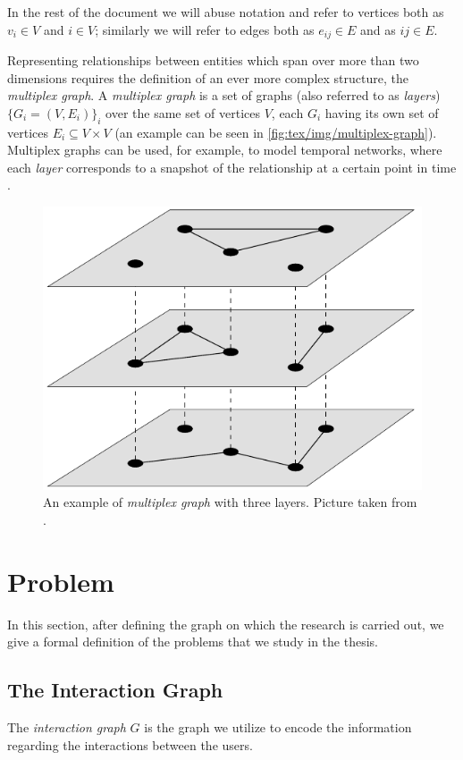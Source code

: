 \bigskip

In the rest of the document we will abuse notation and refer to vertices both
as $v_{i} \in V $ and $i \in V$; similarly we will refer to edges both as
$e_{ij} \in E $ and as $ij \in E$.

\bigskip

Representing relationships between entities which span over more than two
dimensions requires the definition of an ever more complex structure, the
\emph{multiplex graph}. A \emph{multiplex graph} is a set of graphs (also
referred to as \emph{layers}) $\{ G_i = (V, E_i)\} _i$ over the same set of
vertices $V$, each $G_i$ having its own set of vertices $E_i \subseteq V \times V $ (an
example can be seen in \autoref{fig:tex/img/multiplex-graph}). Multiplex graphs
can be used, for example, to model temporal networks, where
each \emph{layer} corresponds to a snapshot of the relationship at a certain
point in time \cite{Newman2018}.

\begin{figure}
	\centering
	\includegraphics[width=0.4\linewidth]{tex/img/multiplex-graph.png}
	\caption[An example of multiplex graph]{An example of \emph{multiplex
			graph} with three layers. Picture taken from
		\cite{Newman2018}.}%
	\label{fig:tex/img/multiplex-graph}
\end{figure}

\section{Problem}
\label{sec:problem}

In this section, after defining the graph on which the research is
carried out, we give a formal definition of the problems that we
study in the thesis.

\subsection{The Interaction Graph}
\label{sub:interaction-graph}

The \emph{interaction graph} $G$ is the graph we utilize to encode the
information regarding the interactions between the users.

